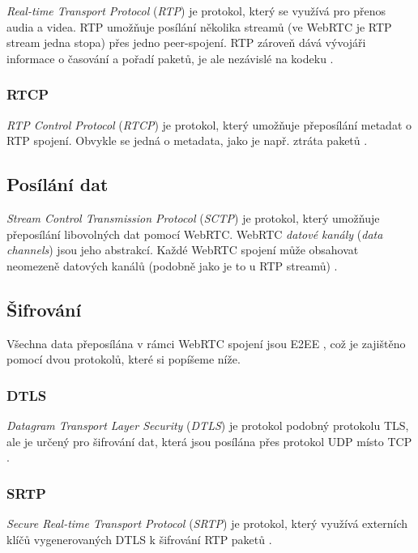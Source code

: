 \textit{Real-time Transport Protocol} (\textit{RTP}) je protokol, který se
využívá pro přenos audia a videa. RTP umožňuje posílání několika streamů (ve
WebRTC je RTP stream jedna stopa) přes jedno peer-spojení. RTP zároveň dává
vývojáři informace o časování a pořadí paketů, je ale nezávislé na kodeku
\cite{WebRTCForTheCurious}.

\subsubsection{RTCP}\label{rtcp}

\textit{RTP Control Protocol} (\textit{RTCP}) je protokol, který umožňuje
přeposílání metadat o RTP spojení. Obvykle se jedná o metadata, jako je např.
ztráta paketů \cite{WebRTCForTheCurious}.

\subsection{Posílání dat}\label{sctp}

\textit{Stream Control Transmission Protocol} (\textit{SCTP}) je protokol, který
umožňuje přeposílání libovolných dat pomocí WebRTC. WebRTC \textit{datové
kanály} (\textit{data channels}) jsou jeho abstrakcí. Každé WebRTC spojení může
obsahovat neomezeně datových kanálů (podobně jako je to u RTP streamů)
\cite{WebRTCForTheCurious}.

\subsection{Šifrování}

Všechna data přeposílána v rámci WebRTC spojení jsou E2EE
\cite{WebRTCForTheCurious}, což je zajištěno pomocí dvou protokolů, které si
popíšeme níže.

\subsubsection{DTLS}

\textit{Datagram Transport Layer Security} (\textit{DTLS}) je protokol podobný
protokolu TLS, ale je určený pro šifrování dat, která jsou posílána přes
protokol UDP místo TCP \cite{WebRTCForTheCurious}.

\subsubsection{SRTP}\label{srtp}

\textit{Secure Real-time Transport Protocol} (\textit{SRTP}) je protokol, který
využívá externích klíčů vygenerovaných DTLS k šifrování RTP paketů
\cite{WebRTCForTheCurious}.

